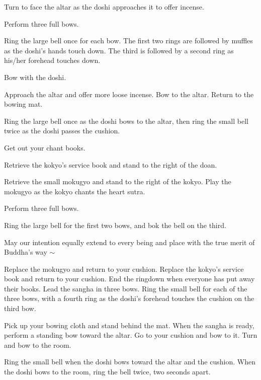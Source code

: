 \documentclass{kdo}
\begin{document}
\begin{services}
\kokyo Turn to face the altar as the doshi approaches it to offer incense.

\doshi Perform three full bows.

\doan Ring the large bell once for each bow. The first two rings are followed
by muffles as the doshi's hands touch down. The third is followed by a second
ring as his/her forehead touches down.
\firstBows

\sangha Bow with the doshi.

\doshi Approach the altar and offer more loose incense. Bow to the altar.
Return to the bowing mat.

\doan Ring the large bell once as the doshi bows to the altar, then ring the
small bell twice as the doshi passes the cushion.
\takeOutChantBookBells

\sangha Get out your chant books.

\kokyo Retrieve the kokyo's service book and stand to the right of the doan.

\tenken Retrieve the small mokugyo and stand to the right of the kokyo. Play the
mokugyo as the kokyo chants the heart sutra.

\doshi Perform three full bows.

\doan Ring the large bell for the first two bows, and bok the bell on the
third.
\secondBows

\kokyo \heartOfGreatPerfectWisdomSutra

\kokyo May our intention equally extend to every being and place with the true
merit of Buddha's way $\sim$ \largebell

\allBuddhas*

\smallBellRolldown

\tenken Replace the mokugyo and return to your cushion.
\kokyo Replace the kokyo's service book and return to your cushion.
\doan End the ringdown when everyone has put away their books.
\doshi Lead the sangha in three bows.
\doan Ring the small bell for each of the three bows, with a fourth ring as the
doshi's forehead touches the cushion on the third bow.
\lastBows

\doshi Pick up your bowing cloth and stand behind the mat. When the sangha is
ready, perform a standing bow toward the altar. Go to your cushion and bow to
it. Turn and bow to the room.

\doan Ring the small bell when the doshi bows toward the altar and the cushion.
When the doshi bows to the room, ring the bell twice, two seconds apart.
\beSeatedBells


\end{services}
\end{document}
